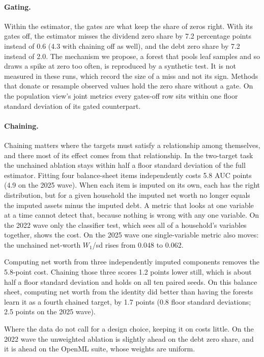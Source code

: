 \paragraph{Gating.} Within the estimator, the gates are what keep the share
of zeros right. With its gates off, the estimator misses the dividend zero
share by 7.2 percentage points instead of 0.6 (4.3 with chaining off as
well), and the \scf{} debt zero share by 7.2 instead of 2.0. The mechanism
we propose, a forest that pools leaf samples and so draws a spike at zero
too often, is reproduced by a synthetic test. It is not measured in these
runs, which record the size of a miss and not its sign. Methods that donate
or resample observed values hold the zero share without a gate. On the
population view's joint metrics every gates-off row sits within one floor
standard deviation of its gated counterpart.

\paragraph{Chaining.} Chaining matters where the targets must satisfy a
relationship among themselves, and there most of its effect comes from that
relationship. In the two-target task the unchained ablation stays within
half a floor standard deviation of the full estimator. Fitting four
balance-sheet items independently costs 5.8 AUC points (4.9 on the 2025
wave). When each item is imputed on its own, each has the right
distribution, but for a given household the imputed net worth no longer
equals the imputed assets minus the imputed debt. A metric that looks at one
variable at a time cannot detect that, because nothing is wrong with any one
variable. On the 2022 wave only the classifier test, which sees all of a
household's variables together, shows the cost. On the 2025 wave one
single-variable metric also moves: the unchained net-worth $W_1$/sd rises
from 0.048 to 0.062.

Computing net worth from three independently imputed components removes the
5.8-point cost. Chaining those three scores 1.2 points lower still, which is
about half a floor standard deviation and holds on all ten paired seeds. On
this balance sheet, computing net worth from the identity did better than
having the forests learn it as a fourth chained target, by 1.7 points (0.8
floor standard deviations; 2.5 points on the 2025 wave).

Where the data do not call for a design choice, keeping it on costs little.
On the 2022 wave the unweighted ablation is slightly ahead on the \scf{}
debt zero share, and it is ahead on the OpenML suite, whose weights are
uniform.

